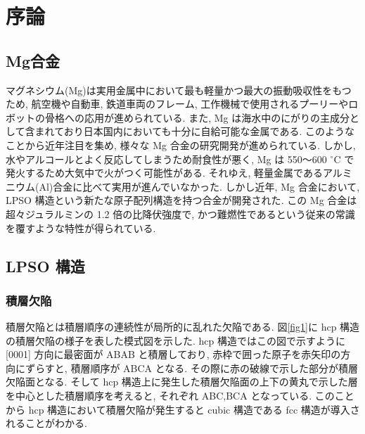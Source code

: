 \chapter{序論}


\section{Mg合金}
マグネシウム(Mg)は実用金属中において最も軽量かつ最大の振動吸収性をもつため, 航空機や自動車, 鉄道車両のフレーム, 工作機械で使用されるプーリーやロボットの骨格への応用が進められている. また,  Mg は海水中のにがりの主成分として含まれており日本国内においても十分に自給可能な金属である. このようなことから近年注目を集め, 様々な Mg 合金の研究開発が進められている. しかし,水やアルコールとよく反応してしまうため耐食性が悪く, Mg は 550〜600 $^\circ$C で発火するため大気中で火がつく可能性がある. それゆえ, 軽量金属であるアルミニウム(Al)合金に比べて実用が進んでいなかった.
しかし近年, Mg 合金において, LPSO 構造という新たな原子配列構造を持つ合金が開発された\cite{Th}. この Mg 合金は超々ジュラルミンの 1.2 倍の比降伏強度で, かつ難燃性であるという従来の常識を覆すような特性が得られている.


\section{LPSO 構造}
\subsection{積層欠陥}
積層欠陥とは積層順序の連続性が局所的に乱れた欠陥である. 図\ref{fig1}に hcp 構造の積層欠陥の様子を表した模式図を示した. hcp 構造ではこの図で示すように [0001] 方向に最密面が ABAB と積層しており, 赤枠で囲った原子を赤矢印の方向にずらすと, 積層順序が ABCA となる. その際に赤の破線で示した部分が積層欠陥面となる. そして hcp 構造上に発生した積層欠陥面の上下の黄丸で示した層を中心とした積層順序を考えると, それぞれ ABC,BCA となっている. このことから hcp 構造において積層欠陥が発生すると cubic 構造である fcc 構造が導入されることがわかる.

